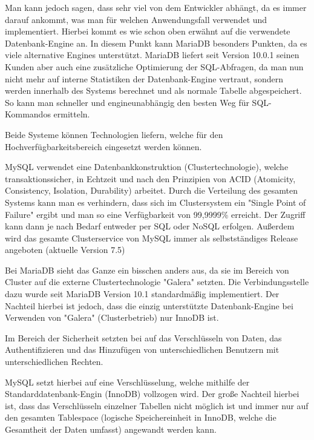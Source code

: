 Man kann jedoch sagen, dass sehr viel von dem Entwickler abhängt, da es immer darauf ankommt, was man für welchen Anwendungsfall verwendet und implementiert. Hierbei kommt es wie schon oben erwähnt auf die verwendete Datenbank-Engine an. In diesem Punkt kann MariaDB besonders Punkten, da es viele alternative Engines unterstützt. MariaDB liefert seit Version 10.0.1 seinen Kunden aber auch eine zusätzliche Optimierung der SQL-Abfragen, da man nun nicht mehr auf interne Statistiken der Datenbank-Engine vertraut, sondern werden innerhalb des Systems berechnet und als normale Tabelle abgespeichert. So kann man schneller und engineunabhängig den besten Weg für SQL-Kommandos ermitteln.


Beide Systeme können Technologien liefern, welche für den Hochverfügbarkeitsbereich eingesetzt werden können.

MySQL verwendet eine Datenbankkonstruktion (Clustertechnologie), welche transaktionssicher, in Echtzeit und nach den Prinzipien von ACID (Atomicity, Consistency, Isolation, Durability) arbeitet. Durch die Verteilung des gesamten Systems kann man es verhindern, dass sich im Clustersystem ein "Single Point of Failure" ergibt und man so eine Verfügbarkeit von 99,9999\% erreicht. Der Zugriff kann dann je nach Bedarf entweder per SQL oder NoSQL erfolgen. Außerdem wird das gesamte Clusterservice von MySQL immer als selbstständiges Release angeboten (aktuelle Version 7.5)

Bei MariaDB sieht das Ganze ein bisschen anders aus, da sie im Bereich von Cluster auf die externe Clustertechnologie "Galera" setzten. Die Verbindungsstelle dazu wurde seit MariaDB Version 10.1 standardmäßig implementiert. Der Nachteil hierbei ist jedoch, dass die einzig unterstützte Datenbank-Engine bei Verwenden von "Galera" (Clusterbetrieb) nur InnoDB ist.


Im Bereich der Sicherheit setzten bei auf das Verschlüsseln von Daten, das Authentifizieren und das Hinzufügen von unterschiedlichen Benutzern mit unterschiedlichen Rechten.

MySQL setzt hierbei auf eine Verschlüsselung, welche mithilfe der Standarddatenbank-Engin (InnoDB) vollzogen wird. Der große Nachteil hierbei ist, dass das Verschlüsseln einzelner Tabellen nicht möglich ist und immer nur auf den gesamten Tablespace (logische Speichereinheit in InnoDB, welche die Gesamtheit der Daten umfasst) angewandt werden kann.

